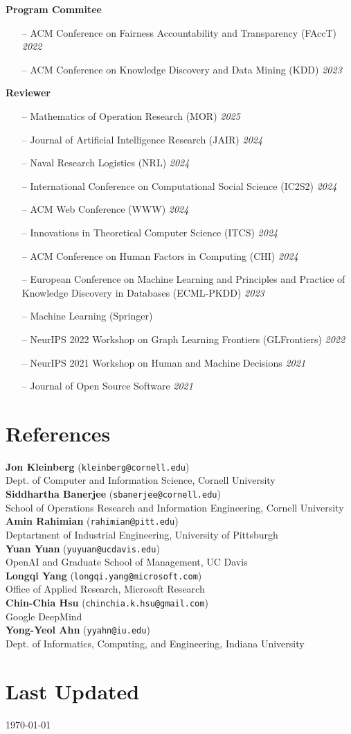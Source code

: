 \documentclass[margin]{res}
\newcommand{\field}[2]{\noindent \textbf{#1} \hfill #2 \\}
\newcommand{\referee}[3]{\textbf{#1} (\texttt{#3})\\{#2}\smallskip \\}
\begin{document}
\begin{resume}
	\field{Program Commitee}{}{
	\begin{itemize}[nosep]
		\item[--] ACM Conference on Fairness Accountability and Transparency (FAccT) \hfill \emph{2022}
		\item[--] ACM Conference on Knowledge Discovery and Data Mining (KDD) \hfill \emph{2023}
	\end{itemize}}
	\field{Reviewer}{}{ 
	\begin{itemize}[nosep]
		\item[--] Mathematics of Operation Research (MOR) \hfill \emph{2025}
		\item[--] Journal of Artificial Intelligence Research (JAIR) \hfill \emph{2024}
		\item[--] Naval Research Logistics (NRL) \hfill \emph{2024}
		\item[--] International Conference on Computational Social Science (IC2S2) \hfill \emph{2024}
		\item[--] ACM Web Conference (WWW) \hfill \emph{2024}
		\item[--] Innovations in Theoretical Computer Science (ITCS) \hfill \emph{2024}
		\item[--] ACM Conference on Human Factors in Computing (CHI) \hfill \emph{2024}
		\item[--] European Conference on Machine Learning and Principles and Practice of Knowledge Discovery in Databases (ECML-PKDD) \hfill \emph{2023}
		\item[--] Machine Learning (Springer)
		\item[--] NeurIPS 2022 Workshop on Graph Learning Frontiers (GLFrontiers) \hfill \emph{2022}
		\item[--] NeurIPS 2021 Workshop on Human and Machine Decisions \hfill \emph{2021} 
		\item[--] Journal of Open Source Software \hfill \emph{2021}
	\end{itemize}}
	
\section{References} \referee{Jon Kleinberg}{Dept. of Computer and Information Science, Cornell University}{kleinberg@cornell.edu}
\referee{Siddhartha Banerjee}{School of Operations Research and Information Engineering, Cornell University}{sbanerjee@cornell.edu}
\referee{Amin Rahimian}{Deptartment of Industrial Engineering, University of Pittsburgh}{rahimian@pitt.edu}
\referee{Yuan Yuan}{OpenAI and Graduate School of Management, UC Davis}{yuyuan@ucdavis.edu}
\referee{Longqi Yang}{Office of Applied Research, Microsoft Research}{longqi.yang@microsoft.com}
\referee{Chin-Chia Hsu}{Google DeepMind}{chinchia.k.hsu@gmail.com}
\referee{Yong-Yeol Ahn}{Dept. of Informatics, Computing, and Engineering, Indiana University}{yyahn@iu.edu}

 \section{Last Updated} \today


\end{resume}
\end{document}
